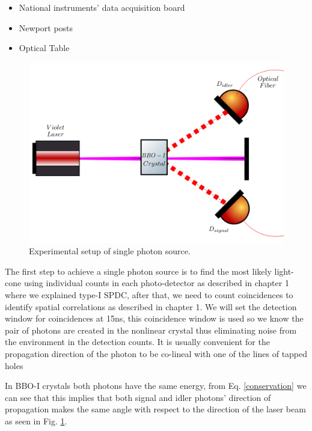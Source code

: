 \documentclass[12pt]{book}
\begin{document}
\begin{itemize}

\item National instruments' data acquisition board
\item Newport posts
\item Optical Table

\end{itemize}

\begin{figure}[t!]
\centering
\includegraphics[width=\linewidth]{images/SPDC_exp.png}
\caption{Experimental setup of single photon source.}
\label{single}
\end{figure}







The first step to achieve a single photon source is to find the most likely light-cone using individual counts in each photo-detector as described in chapter 1  where we explained type-I SPDC, after that, we need to count coincidences to identify spatial correlations as described in chapter 1. We will set the detection window for coincidences at 15ns, this coincidence window is used so we know the pair of photons are created in the nonlinear crystal thus eliminating noise from the environment in the detection counts. It is usually convenient for the propagation direction of the photon to be co-lineal with one of the lines of tapped holes

In BBO-I crystals both photons have the same energy, from Eq. \ref{conservation} we can see that this implies that both signal and idler photons' direction of propagation makes the same angle with respect to the direction of the laser beam as seen in Fig. \ref{single}.
\end{document}
